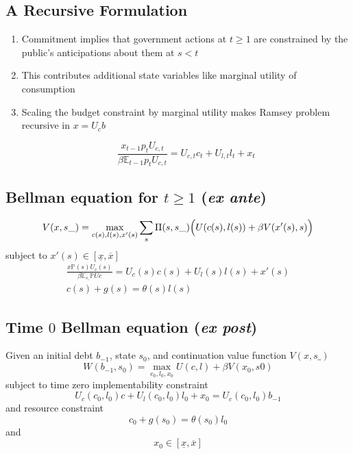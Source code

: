 \documentclass[12pt]{article}
\newcommand{\EE}{\mathbb E}
\begin{document}
\subsection{A Recursive Formulation}
	
	\begin{enumerate}
	 \item Commitment implies that government actions at $t \geq 1$ are constrained by the public's anticipations about them at $s < t$
	 \item This contributes additional state variables like marginal utility of consumption
	 \item Scaling the budget constraint by marginal utility makes Ramsey problem  recursive in  $x=U_c b$
	
	\[
		\frac{x_{t-1} p_t U_{c,t}}{\beta \EE_{t-1} p_t U_{c,t}}  = U_{c,t}c_t+U_{l,t} l_t + x_t
	\]
	
	\end{enumerate}
	
	
	\subsection{Bellman equation for $t\geq1$ (\textit{ex ante})}
	\[
		V(x,s\_) = \max_{c(s),l(s),x'(s)} \sum_s \Pi(s,s\_)\Bigl(U(c(s),l(s)) + \beta V(x'(s),s)\Bigr)
	\]subject to $x'(s)\in [\underline x,\overline x]$
	\begin{align*}
		\frac{x \mathbb{P}(s) U_c(s)}{\beta\EE_{s\_} \mathbb{P}Uc} =U_c(s)c(s)+U_l(s)l(s) + x'(s)\\
		c(s) + g(s) = \theta(s)l(s)
	\end{align*}
	
 \subsection{Time $0$ Bellman equation (\textit{ex post})}
	Given an initial  debt $b_{-1}$, state $s_0$,  and continuation value function $V(x,s\_)$
	\[
		W(b_{-1},s_0) = \max_{c_{0},l_0,x_{0}} U(c,l) +\beta V(x_0,s0)
	\]subject to  time zero implementability constraint
	\[
		U_{c}(c_0,l_0)c + U_l(c_0,l_0) l_0 + x_0 = U_c(c_0,l_0) b_{-1}
	\]and  resource constraint
	\[
		c_0+ g(s_0) = \theta(s_0) l_0
	\]and
	\[
		x_0 \in [\underline x,\overline x]
	\]
\end{document}
